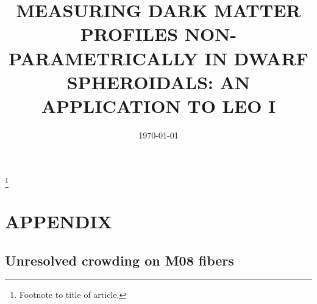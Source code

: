 \documentclass[%
 aip,
 jmp,%
 amsmath,amssymb,
 reprint,%
]{aastex61}
\begin{document}

\title[MEASURING DARK MATTER PROFILES NON-PARAMETRICALLY IN DWARF SPHEROIDALS]{MEASURING DARK MATTER PROFILES NON-PARAMETRICALLY IN DWARF SPHEROIDALS:
	AN APPLICATION TO LEO I}%
\thanks{Footnote to title of article.}


\date{\today}%




\section{APPENDIX}

\subsection{Unresolved crowding on M08 fibers}
\end{document}

